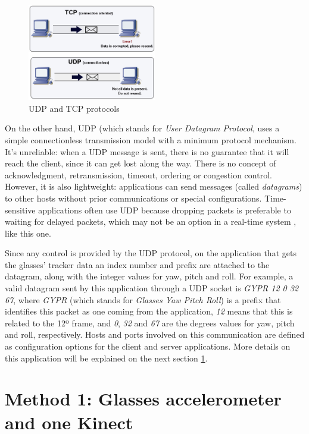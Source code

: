 \documentclass[msc, a4paper, classic, en]{ufbathesis}
\begin{document}
\begin{figure}
\centering
\includegraphics[width=0.5\textwidth]{images/udptcp.png}
\caption{UDP and TCP protocols}
\label{fig:udptcp}
\end{figure}

On the other hand, UDP (which stands for \textit{User Datagram Protocol}, uses a simple connectionless transmission model with a minimum protocol mechanism. It's unreliable: when a UDP message is sent, there is no guarantee that it will reach the client, since it can get lost along the way. There is no concept of acknowledgment, retransmission, timeout, ordering or congestion control. However, it is also lightweight: applications can send messages (called \textit{datagrams}) to other hosts without prior communications or special configurations. Time-sensitive applications often use UDP because dropping packets is preferable to waiting for delayed packets, which may not be an option in a real-time system \cite{udp}, like this one.

Since any control is provided by the UDP protocol, on the application that gets the glasses' tracker data an index number and prefix are attached to the datagram, along with the integer values for yaw, pitch and roll. For example, a valid datagram sent by this application through a UDP socket is \textit{GYPR 12 0 32 67}, where \textit{GYPR} (which stands for \textit{Glasses Yaw Pitch Roll}) is a prefix that identifies this packet as one coming from the application, \textit{12} means that this is related to the 12º frame, and \textit{0}, \textit{32} and \textit{67} are the degrees values for yaw, pitch and roll, respectively. Hosts and ports involved on this communication are defined as configuration options for the client and server applications. More details on this application will be explained on the next section \ref{sec:method1}.

\section{Method 1: Glasses accelerometer and one Kinect}
\label{sec:method1}
\end{document}
